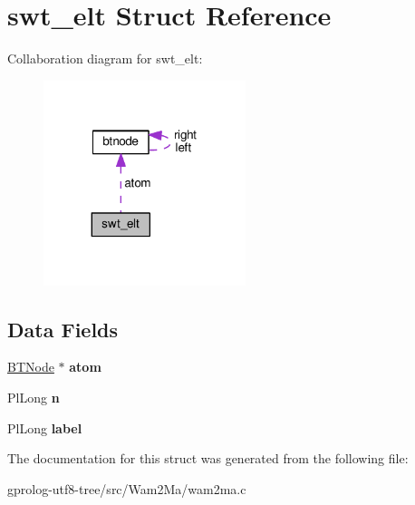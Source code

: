 \hypertarget{structswt__elt}{}\section{swt\+\_\+elt Struct Reference}
\label{structswt__elt}


Collaboration diagram for swt\+\_\+elt\+:\nopagebreak
\begin{figure}[H]
\begin{center}
\leavevmode
\includegraphics[width=167pt]{structswt__elt__coll__graph}
\end{center}
\end{figure}
\subsection*{Data Fields}
\begin{DoxyCompactItemize}
\item 
\hyperlink{structbtnode}{B\+T\+Node} $\ast$ {\bfseries atom}\hypertarget{structswt__elt_a04d09a38ab072084ef44f3b17a75b25d}{}\label{structswt__elt_a04d09a38ab072084ef44f3b17a75b25d}

\item 
Pl\+Long {\bfseries n}\hypertarget{structswt__elt_aa3fb3cf68a09b57a7abad92d1888d297}{}\label{structswt__elt_aa3fb3cf68a09b57a7abad92d1888d297}

\item 
Pl\+Long {\bfseries label}\hypertarget{structswt__elt_a979d2691c64643e5d59f471a3e5e40f6}{}\label{structswt__elt_a979d2691c64643e5d59f471a3e5e40f6}

\end{DoxyCompactItemize}


The documentation for this struct was generated from the following file\+:\begin{DoxyCompactItemize}
\item 
gprolog-\/utf8-\/tree/src/\+Wam2\+Ma/wam2ma.\+c\end{DoxyCompactItemize}
